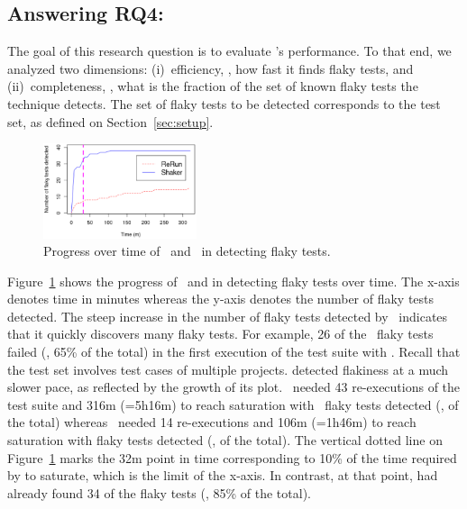 \documentclass[conference]{IEEEtran}
\begin{document}
\subsection{Answering RQ4: \rqfour}
\label{sec:answer:rqfour}

The goal of this research question is to evaluate \tname{}'s performance. To that end, we analyzed two dimensions: (i)~efficiency, \ie{}, how fast it finds flaky tests, and (ii)~completeness, \ie{}, what is the fraction of the set of known flaky tests the technique detects. The set of flaky tests to be detected corresponds to the test set, as defined on Section~\ref{sec:setup}. 

\begin{figure}[t!]
    \centering
    \includegraphics[width=0.4\textwidth]{figs/auc.eps}
    \vspace{-2ex}
    \caption{Progress over time of \tname\ and \rerun\ in detecting flaky tests.}
    \label{fig:auc}
    \vspace{-3ex}
\end{figure}

Figure~\ref{fig:auc} shows the progress of \tname\ and \rerun{} in detecting flaky tests over time. The x-axis denotes time in minutes whereas the y-axis denotes the number of flaky tests detected. The steep increase in the number of flaky tests detected by \tname\ indicates that it quickly discovers many flaky tests. For example, 26 of the \numflakytesting\ flaky tests failed (\ie{}, 65\% of the total) in the first execution of the test suite with \tname. Recall that the test set involves test cases of multiple projects. \rerun{} detected flakiness at a much slower pace, as reflected by the growth of its plot. \rerun\ needed 43 re-executions of the test suite and 316m (=5h16m) to reach saturation with \numFlakyDetectedReRun\ flaky tests detected (\ie{}, \percFlakyDetectedReRun{} of the total) whereas \tname\ needed 14 re-executions and 106m (=1h46m) to reach saturation with \numFlakyDetectedShaker{} flaky tests detected (\ie{}, \percFlakyDetectedShaker{} of the total). The vertical dotted line on Figure~\ref{fig:auc} marks the 32m point in time corresponding to 10\% of the time required by \rerun{} to saturate, which is the limit of the x-axis. In contrast, at that point, \tname{} had already found 34 of the flaky tests (\ie{}, 85\% of the total). 
\end{document}
